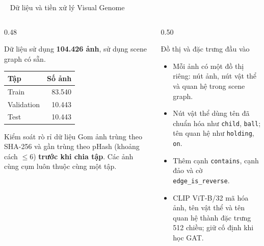 \documentclass[aspectratio=169,10pt]{beamer}
\newcommand{\leveltag}[2]{%
  \tikz[baseline=(x.base)]{\node[fill=#1,text=white,inner xsep=5pt,inner ysep=1.5pt,
    rounded corners=2pt,font=\scriptsize\bfseries](x){#2};}\ %
}
\begin{document}
\begin{frame}{\leveltag{L1Blue}{CẤP ĐỘ 1} Dữ liệu và tiền xử lý Visual Genome}
  \begin{columns}[t]
    \begin{column}{0.48\textwidth}
      \begin{block}{Dữ liệu sử dụng}\footnotesize
        \textbf{104.426 ảnh}, sử dụng scene graph có sẵn.\\[0.12cm]
        \begin{tabularx}{\linewidth}{@{}Xr@{}}
          \toprule Tập & Số ảnh\\ \midrule
          Train & 83.540\\ Validation & 10.443\\ Test & 10.443\\ \bottomrule
        \end{tabularx}
      \end{block}
      \begin{exampleblock}{Kiểm soát rò rỉ dữ liệu}\footnotesize
        Gom ảnh trùng theo SHA-256 và gần trùng theo pHash (khoảng cách $\le6$) \textbf{trước khi chia tập}. Các ảnh cùng cụm luôn thuộc cùng một tập.
      \end{exampleblock}
    \end{column}
    \begin{column}{0.50\textwidth}
      \begin{block}{Đồ thị và đặc trưng đầu vào}\footnotesize
        \begin{itemize}
          \item Mỗi ảnh có một đồ thị riêng: nút ảnh, nút vật thể và quan hệ trong scene graph.
          \item Nút vật thể dùng tên đã chuẩn hóa như \texttt{child}, \texttt{ball}; tên quan hệ như \texttt{holding}, \texttt{on}.
          \item Thêm cạnh \texttt{contains}, cạnh đảo và cờ \texttt{edge\_is\_reverse}.
          \item CLIP ViT-B/32 mã hóa ảnh, tên vật thể và tên quan hệ thành đặc trưng 512 chiều; giữ cố định khi học GAT.
        \end{itemize}
      \end{block}
    \end{column}
  \end{columns}
\end{frame}
\end{document}
